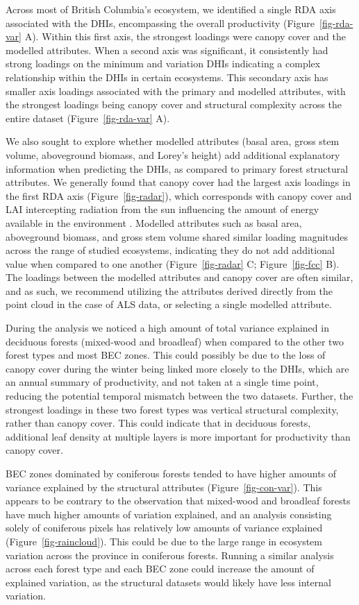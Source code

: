 \documentclass[
  authoryear,
  review,
  3p,
  twocolumn]{elsarticle}
\begin{document}
Across most of British Columbia's ecosystem, we identified a single RDA
axis associated with the DHIs, encompassing the overall productivity
(Figure~\ref{fig-rda-var} A). Within this first axis, the strongest
loadings were canopy cover and the modelled attributes. When a second
axis was significant, it consistently had strong loadings on the minimum
and variation DHIs indicating a complex relationship within the DHIs in
certain ecosystems. This secondary axis has smaller axis loadings
associated with the primary and modelled attributes, with the strongest
loadings being canopy cover and structural complexity across the entire
dataset (Figure~\ref{fig-rda-var} A).

We also sought to explore whether modelled attributes (basal area, gross
stem volume, aboveground biomass, and Lorey's height) add additional
explanatory information when predicting the DHIs, as compared to primary
forest structural attributes. We generally found that canopy cover had
the largest axis loadings in the first RDA axis
(Figure~\ref{fig-radar}), which corresponds with canopy cover and LAI
intercepting radiation from the sun influencing the amount of energy
available in the environment \citep{knyazikhin1998}. Modelled attributes
such as basal area, aboveground biomass, and gross stem volume shared
similar loading magnitudes across the range of studied ecosystems,
indicating they do not add additional value when compared to one another
(Figure~\ref{fig-radar} C; Figure~\ref{fig-fcc} B). The loadings between
the modelled attributes and canopy cover are often similar, and as such,
we recommend utilizing the attributes derived directly from the point
cloud in the case of ALS data, or selecting a single modelled attribute.

During the analysis we noticed a high amount of total variance explained
in deciduous forests (mixed-wood and broadleaf) when compared to the
other two forest types and most BEC zones. This could possibly be due to
the loss of canopy cover during the winter being linked more closely to
the DHIs, which are an annual summary of productivity, and not taken at
a single time point, reducing the potential temporal mismatch between
the two datasets. Further, the strongest loadings in these two forest
types was vertical structural complexity, rather than canopy cover. This
could indicate that in deciduous forests, additional leaf density at
multiple layers is more important for productivity than canopy cover.

BEC zones dominated by coniferous forests tended to have higher amounts
of variance explained by the structural attributes
(Figure~\ref{fig-con-var}). This appears to be contrary to the
observation that mixed-wood and broadleaf forests have much higher
amounts of variation explained, and an analysis consisting solely of
coniferous pixels has relatively low amounts of variance explained
(Figure~\ref{fig-raincloud}). This could be due to the large range in
ecosystem variation across the province in coniferous forests. Running a
similar analysis across each forest type and each BEC zone could
increase the amount of explained variation, as the structural datasets
would likely have less internal variation.
\end{document}
